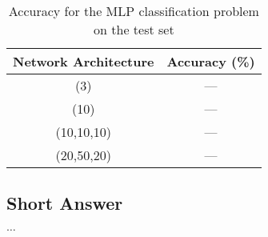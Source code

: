 \begin{table}[H]
\centering
\begin{tabular}{ |c|c| } 
 \hline
 \textbf{Network Architecture} & \textbf{Accuracy (\%)} \\
 \hline
 (3) & --- \\ 
 (10) & --- \\
 (10,10,10) & --- \\ 
 (20,50,20) & --- \\ 
 \hline
\end{tabular}
\caption{Accuracy for the MLP classification problem on the test set}
\label{mlpTable}
\end{table}

\subsection{Short Answer}
$\ldots$